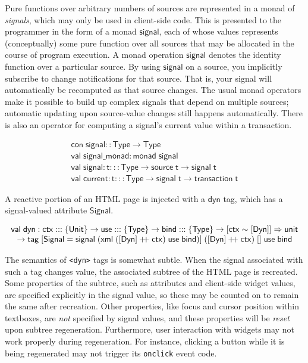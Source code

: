 \documentclass{article}
\newcommand{\cd}[1]{\texttt{#1}}
\newcommand{\mt}[1]{\mathsf{#1}}
\newcommand{\rc}{+ \hspace{-.075in} + \;}
\begin{document}
Pure functions over arbitrary numbers of sources are represented in a monad of \emph{signals}, which may only be used in client-side code.  This is presented to the programmer in the form of a monad $\mt{signal}$, each of whose values represents (conceptually) some pure function over all sources that may be allocated in the course of program execution.  A monad operation $\mt{signal}$ denotes the identity function over a particular source.  By using $\mt{signal}$ on a source, you implicitly subscribe to change notifications for that source.  That is, your signal will automatically be recomputed as that source changes.  The usual monad operators make it possible to build up complex signals that depend on multiple sources; automatic updating upon source-value changes still happens automatically.  There is also an operator for computing a signal's current value within a transaction.

$$\begin{array}{l}
  \mt{con} \; \mt{signal} :: \mt{Type} \to \mt{Type} \\
  \mt{val} \; \mt{signal\_monad} : \mt{monad} \; \mt{signal} \\
  \mt{val} \; \mt{signal} : \mt{t} ::: \mt{Type} \to \mt{source} \; \mt{t} \to \mt{signal} \; \mt{t} \\
  \mt{val} \; \mt{current} : \mt{t} ::: \mt{Type} \to \mt{signal} \; \mt{t} \to \mt{transaction} \; \mt{t}
\end{array}$$

A reactive portion of an HTML page is injected with a $\mt{dyn}$ tag, which has a signal-valued attribute $\mt{Signal}$.

$$\begin{array}{l}
  \mt{val} \; \mt{dyn} : \mt{ctx} ::: \{\mt{Unit}\} \to \mt{use} ::: \{\mt{Type}\} \to \mt{bind} ::: \{\mt{Type}\} \to [\mt{ctx} \sim [\mt{Dyn}]] \Rightarrow \mt{unit} \\
  \hspace{.1in} \to \mt{tag} \; [\mt{Signal} = \mt{signal} \; (\mt{xml} \; ([\mt{Dyn}] \rc \mt{ctx}) \; \mt{use} \; \mt{bind})] \; ([\mt{Dyn}] \rc \mt{ctx}) \; [] \; \mt{use} \; \mt{bind}
\end{array}$$

The semantics of \cd{<dyn>} tags is somewhat subtle.  When the signal associated with such a tag changes value, the associated subtree of the HTML page is recreated.  Some properties of the subtree, such as attributes and client-side widget values, are specified explicitly in the signal value, so these may be counted on to remain the same after recreation.  Other properties, like focus and cursor position within textboxes, are \emph{not} specified by signal values, and these properties will be \emph{reset} upon subtree regeneration.  Furthermore, user interaction with widgets may not work properly during regeneration.  For instance, clicking a button while it is being regenerated may not trigger its \cd{onclick} event code.
\end{document}
